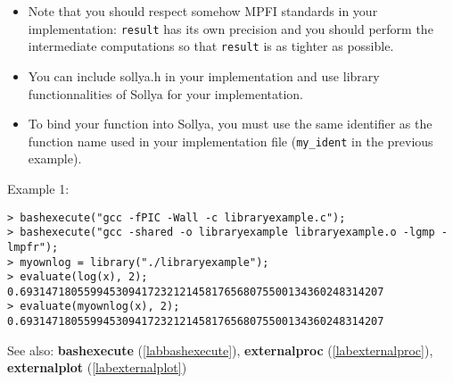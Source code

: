 \begin{itemize}
\item Note that you should respect somehow MPFI standards in your implementation:
   \verb|result| has its own precision and you should perform the 
   intermediate computations so that \verb|result| is as tighter as possible.

\item You can include sollya.h in your implementation and use library 
   functionnalities of Sollya for your implementation.

\item To bind your function into Sollya, you must use the same identifier as the
   function name used in your implementation file (\verb|my_ident| in the previous
   example).
\end{itemize}
\noindent Example 1: 
\begin{center}\begin{minipage}{15cm}\begin{Verbatim}[frame=single]
> bashexecute("gcc -fPIC -Wall -c libraryexample.c");
> bashexecute("gcc -shared -o libraryexample libraryexample.o -lgmp -lmpfr");
> myownlog = library("./libraryexample");
> evaluate(log(x), 2);
0.693147180559945309417232121458176568075500134360248314207
> evaluate(myownlog(x), 2);
0.693147180559945309417232121458176568075500134360248314207
\end{Verbatim}
\end{minipage}\end{center}
See also: \textbf{bashexecute} (\ref{labbashexecute}), \textbf{externalproc} (\ref{labexternalproc}), \textbf{externalplot} (\ref{labexternalplot})
